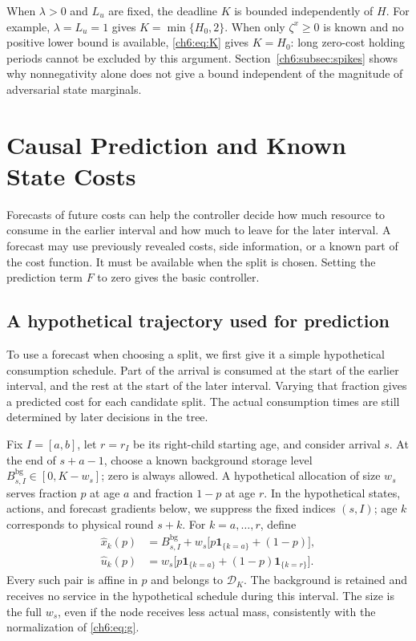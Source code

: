 \documentclass[11pt]{article}
\newcommand{\ind}[1]{\mathbf{1}_{\{#1\}}}
\theoremstyle{plain}
\theoremstyle{remark}
\numberwithin{equation}{section}
\begin{document}
When $\lambda>0$ and $L_u$ are fixed, the deadline $K$ is bounded
independently of $H$. For example, $\lambda=L_u=1$ gives
$K=\min\{H_0,2\}$. When only $\zeta^x\ge0$ is known and no positive lower
bound is available, \eqref{ch6:eq:K} gives $K=H_0$: long zero-cost holding
periods cannot be excluded by this argument.
Section~\ref{ch6:subsec:spikes} shows why nonnegativity alone does not give a
bound independent of the magnitude of adversarial state marginals.

\section{Causal Prediction and Known State Costs}
\label{ch6:sec:prediction}
Forecasts of future costs can help the controller decide how much resource
to consume in the earlier interval and how much to leave for the later
interval. A forecast may use previously revealed costs, side information,
or a known part of the cost function. It must be available when the split
is chosen. Setting the prediction term $F$ to zero gives the basic
controller.

\subsection{A hypothetical trajectory used for prediction}
To use a forecast when choosing a split, we first give it a simple
hypothetical consumption schedule. Part of the arrival is consumed at the
start of the earlier interval, and the rest at the start of the later
interval. Varying that fraction gives a predicted cost for each candidate
split. The actual consumption times are still determined by later decisions
in the tree.

Fix $I=[a,b]$, let $r=r_I$ be its right-child starting age, and consider
arrival $s$. At the end of $s+a-1$, choose a known background storage level
$B_{s,I}^{\mathrm{bg}}\in[0,K-w_s]$; zero is always allowed.
A hypothetical allocation of size $w_s$ serves fraction $p$ at age
$a$ and fraction $1-p$ at age $r$. In the hypothetical states, actions,
and forecast gradients below, we suppress the fixed indices $(s,I)$;
age $k$ corresponds to physical round $s+k$. For $k=a,\ldots,r$, define
\begin{align}
 \widehat x_k(p)&=B_{s,I}^{\mathrm{bg}}
 +w_s\bigl[p\ind{k=a}+(1-p)\bigr],\label{ch6:eq:virtual-x}\\
 \widehat u_k(p)&=w_s\bigl[p\ind{k=a}
 +(1-p)\ind{k=r}\bigr].\label{ch6:eq:virtual-u}
\end{align}
Every such pair is affine in $p$ and belongs to $\mathcal{D}_K$.
The background is retained and receives no service in the hypothetical schedule during this
interval. The size is the full $w_s$, even if the node receives less actual
mass, consistently with the normalization of \eqref{ch6:eq:g}.
\end{document}
